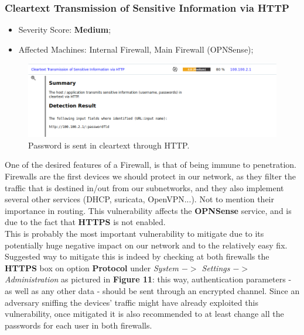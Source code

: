 \subsubsection{Cleartext Transmission of Sensitive Information via HTTP}
\begin{itemize}
\item Severity Score: \textbf{Medium};
\item Affected Machines: Internal Firewall, Main Firewall (OPNSense);
\end{itemize}
\begin{figure}[!htb]
\centering
\begin{minipage}{.5\textwidth}
  \centering
  \includegraphics[width=1\textwidth]{clearTextHTTPfirewallVuln.png}
  \caption[a]{Password is sent in cleartext through HTTP.}\label{fig:10}
\end{minipage}%
\end{figure}

One of the desired features of a Firewall, is that of being immune to penetration. Firewalls are the first devices we should protect in our network, as they filter the traffic that is destined in/out from our subnetworks, and they also implement several other services (DHCP, suricata, OpenVPN...). Not to mention their importance in routing. This vulnerability affects the \textbf{OPNSense} service, and is due to the fact that \textbf{HTTPS} is not enabled.\\
This is probably the most important vulnerability to mitigate due to its potentially huge negative impact on our network and to the relatively easy fix.\\
Suggested way to mitigate this is indeed by checking at both firewalls the \textbf{HTTPS} box on option \textbf{Protocol} under \textit{System $->$ Settings $->$ Administration} as pictured in \textbf{Figure 11}: this way, authentication parameters - as well as any other data - should be sent through an encrypted channel. Since an adversary sniffing the devices' traffic might have already exploited this vulnerability, once mitigated it is also recommended to at least change all the passwords for each user in both firewalls.

